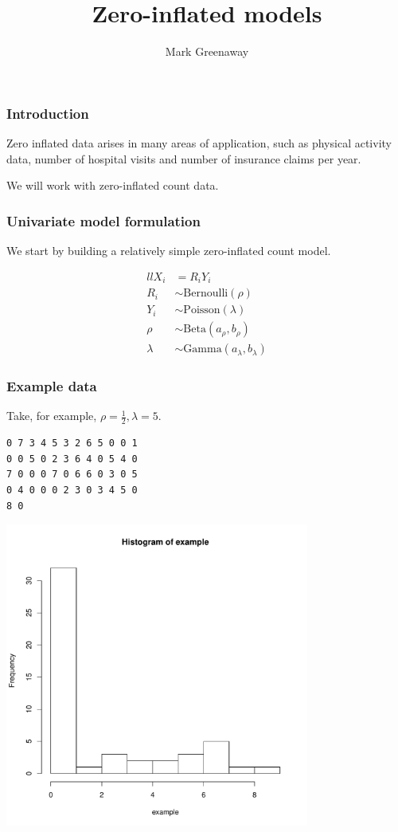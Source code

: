\documentclass{beamer}
\title{Zero-inflated models}
\author{Mark Greenaway}
\begin{document}
\begin{frame}
\titlepage
\end{frame}

\begin{frame}
\frametitle{Introduction}
Zero inflated data arises in many areas of application, such as physical
activity data, number of hospital visits and number of insurance claims per
year.

We will work with zero-inflated count data.
\end{frame}
\begin{frame}
\frametitle{Univariate model formulation}
We start by building a relatively simple zero-inflated count model.

\begin{align*}{ll}
X_i &= R_i Y_i \\
R_i &\sim \text{Bernoulli}(\rho) \\
Y_i &\sim \text{Poisson}(\lambda) \\
\rho &\sim \text{Beta}(a_\rho, b_\rho) \\
\lambda &\sim \text{Gamma}(a_\lambda, b_\lambda)
\end{align*}

\end{frame}

\begin{frame}[fragile]
\frametitle{Example data}
Take, for example, $\rho = \frac{1}{2}, \lambda = 5$.

\begin{verbatim}
0 7 3 4 5 3 2 6 5 0 0 1
0 0 5 0 2 3 6 4 0 5 4 0
7 0 0 0 7 0 6 6 0 3 0 5
0 4 0 0 0 2 3 0 3 4 5 0
8 0
\end{verbatim}

\includegraphics[width=100mm, height=100mm]{code/univariate_data_histogram.pdf}
\end{frame}
\end{document}
